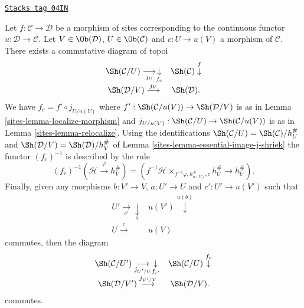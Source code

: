 \begin{lemma}
\label{sites-lemma-relocalize-morphism}
\href{https://stacks.math.columbia.edu/tag/04IN}{\texttt{Stacks tag 04IN}}

Let $f : \mathcal{C} \to \mathcal{D}$ be a morphism of sites
corresponding to the continuous functor $u : \mathcal{D} \to \mathcal{C}$.
Let $V \in \Ob(\mathcal{D})$, $U \in \Ob(\mathcal{C})$
and $c : U \to u(V)$ a morphism of $\mathcal{C}$.
There exists a commutative diagram of topoi
$$
\begin{array}{cc}\Sh(\mathcal{C}/U) \underset{j_U}{\longrightarrow}\underset{f_c}{\downarrow} & \Sh(\mathcal{C}) \overset{f}{\downarrow} \\ \Sh(\mathcal{D}/V) \overset{j_V}{\longrightarrow} & \Sh(\mathcal{D}).\end{array}
$$
We have $f_c = f' \circ j_{U/u(V)}$ where
$f' : \Sh(\mathcal{C}/u(V)) \to \Sh(\mathcal{D}/V)$
is as in
Lemma \ref{sites-lemma-localize-morphism}
and
$j_{U/u(V)} : \Sh(\mathcal{C}/U) \to \Sh(\mathcal{C}/u(V))$
is as in
Lemma \ref{sites-lemma-relocalize}.
Using the identifications
$\Sh(\mathcal{C}/U) = \Sh(\mathcal{C})/h_U^\#$ and
$\Sh(\mathcal{D}/V) = \Sh(\mathcal{D})/h_V^\#$ of
Lemma \ref{sites-lemma-essential-image-j-shriek}
the functor $(f_c)^{-1}$ is described by the rule
$$
(f_c)^{-1}(\mathcal{H} \xrightarrow{\varphi} h_V^\#)
=
(f^{-1}\mathcal{H} \times_{f^{-1}\varphi, h_{u(V)}^\#, c} h_U^\#
\rightarrow h_U^\#).
$$
Finally, given any morphisms $b : V' \to V$, $a : U' \to U$ and
$c' : U' \to u(V')$ such that
$$
\begin{array}{cc}U' \underset{c'}{\longrightarrow}\underset{a}{\downarrow} & u(V') \overset{u(b)}{\downarrow} \\ U \overset{c}{\longrightarrow} & u(V)\end{array}
$$
commutes, then the diagram
$$
\begin{array}{cc}\Sh(\mathcal{C}/U') \underset{j_{U'/U}}{\longrightarrow}\underset{f_{c'}}{\downarrow} & \Sh(\mathcal{C}/U) \overset{f_c}{\downarrow} \\ \Sh(\mathcal{D}/V') \overset{j_{V'/V}}{\longrightarrow} & \Sh(\mathcal{D}/V).\end{array}
$$
commutes.
\end{lemma}

